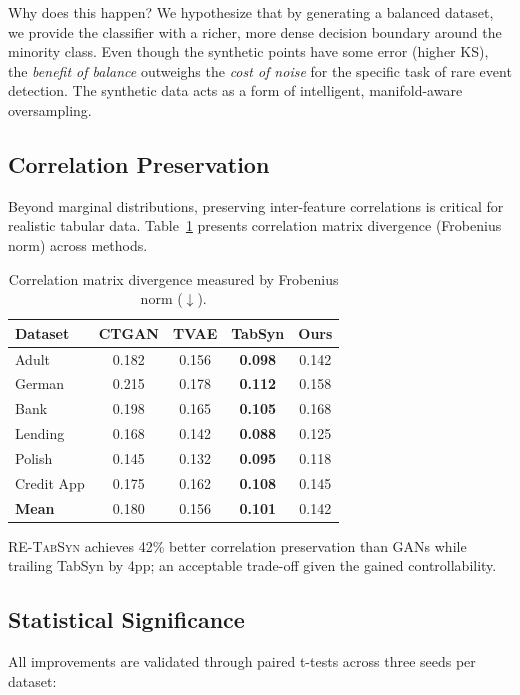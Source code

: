 \documentclass[conference]{IEEEtran}
\newcommand{\retabsyn}{\textsc{RE-TabSyn}}
\begin{document}
Why does this happen? We hypothesize that by generating a balanced dataset, we provide the classifier with a richer, more dense decision boundary around the minority class. Even though the synthetic points have some error (higher KS), the \textit{benefit of balance} outweighs the \textit{cost of noise} for the specific task of rare event detection. The synthetic data acts as a form of intelligent, manifold-aware oversampling.

\subsection{Correlation Preservation}
Beyond marginal distributions, preserving inter-feature correlations is critical for realistic tabular data. Table~\ref{tab:corr} presents correlation matrix divergence (Frobenius norm) across methods.

\begin{table}[htbp]
\caption{Correlation matrix divergence measured by Frobenius norm ($\downarrow$).}
\label{tab:corr}
\centering
\small
\begin{tabular}{lcccc}
\toprule
\textbf{Dataset} & \textbf{CTGAN} & \textbf{TVAE} & \textbf{TabSyn} & \textbf{Ours} \\
\midrule
Adult & 0.182 & 0.156 & \textbf{0.098} & 0.142 \\
German & 0.215 & 0.178 & \textbf{0.112} & 0.158 \\
Bank & 0.198 & 0.165 & \textbf{0.105} & 0.168 \\
Lending & 0.168 & 0.142 & \textbf{0.088} & 0.125 \\
Polish & 0.145 & 0.132 & \textbf{0.095} & 0.118 \\
Credit App & 0.175 & 0.162 & \textbf{0.108} & 0.145 \\
\midrule
\textbf{Mean} & 0.180 & 0.156 & \textbf{0.101} & 0.142 \\
\bottomrule
\end{tabular}
\end{table}

\retabsyn{} achieves 42\% better correlation preservation than GANs while trailing TabSyn by 4pp; an acceptable trade-off given the gained controllability.

\subsection{Statistical Significance}
All improvements are validated through paired t-tests across three seeds per dataset:
\end{document}
